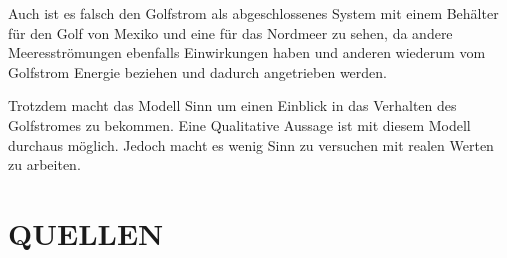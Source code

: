 \documentclass[a4paper,twoside]{article}
\begin{document}
	Auch ist es falsch den Golfstrom als abgeschlossenes System mit einem Behälter für den Golf von Mexiko und eine für das Nordmeer zu sehen, da andere Meeresströmungen ebenfalls Einwirkungen haben und anderen wiederum vom Golfstrom Energie beziehen und dadurch angetrieben werden.
	
	Trotzdem macht das Modell Sinn um einen Einblick in das Verhalten des Golfstromes zu bekommen. Eine Qualitative Aussage ist mit diesem Modell durchaus möglich. Jedoch macht es wenig Sinn zu versuchen mit realen Werten zu arbeiten. 
	
 	\section{\uppercase{Quellen}}\label{sec: Quellen}		

	\nocite{*}
	
	
\end{document}
